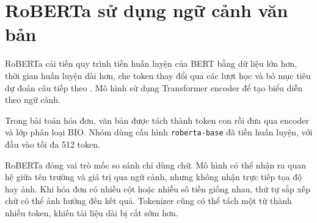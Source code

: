 \section{RoBERTa sử dụng ngữ cảnh văn bản}
RoBERTa cải tiến quy trình tiền huấn luyện của BERT bằng dữ liệu lớn hơn, thời gian huấn luyện dài hơn, che token thay đổi qua các lượt học và bỏ mục tiêu dự đoán câu tiếp theo \parencite{liu2019}. Mô hình sử dụng Transformer encoder để tạo biểu diễn theo ngữ cảnh.

Trong bài toán hóa đơn, văn bản được tách thành token con rồi đưa qua encoder và lớp phân loại BIO. Nhóm dùng cấu hình \texttt{roberta-base} đã tiền huấn luyện, với đầu vào tối đa 512 token.

RoBERTa đóng vai trò mốc so sánh chỉ dùng chữ. Mô hình có thể nhận ra quan hệ giữa tên trường và giá trị qua ngữ cảnh, nhưng không nhận trực tiếp tọa độ hay ảnh. Khi hóa đơn có nhiều cột hoặc nhiều số tiền giống nhau, thứ tự sắp xếp chữ có thể ảnh hưởng đến kết quả. Tokenizer cũng có thể tách một từ thành nhiều token, khiến tài liệu dài bị cắt sớm hơn.
